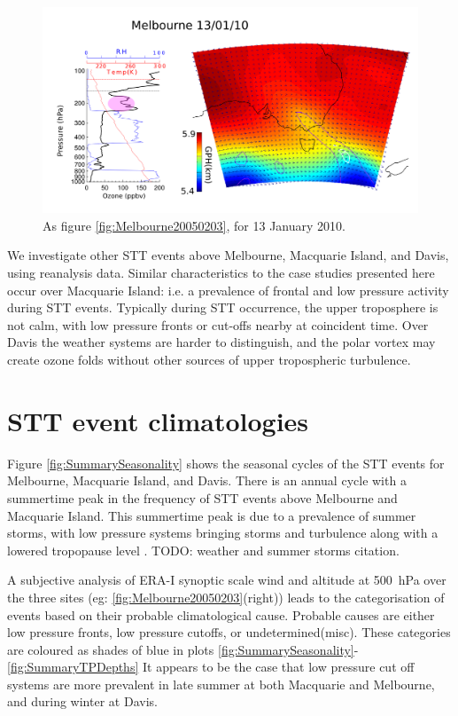 \documentclass{article}
\begin{document}
  \begin{figure}[!htbp]
    \begin{center}
    \includegraphics[width=1.0\columnwidth]{figures/Melbourne20100113.png}
    \caption{As figure \ref{fig:Melbourne20050203}, for 13 January 2010.}
    \label{fig:Melbourne20100113}
    \end{center}
  \end{figure}

  We investigate other STT events above Melbourne, Macquarie Island, and Davis, using reanalysis data.
  Similar characteristics to the case studies presented here occur over Macquarie Island: i.e. a prevalence of frontal and low pressure activity during STT events.
  Typically during STT occurrence, the upper troposphere is not calm, with low pressure fronts or cut-offs nearby at coincident time.
  Over Davis the weather systems are harder to distinguish, and the polar vortex may create ozone folds without other sources of upper tropospheric turbulence.

\section{STT event climatologies}

  Figure \ref{fig:SummarySeasonality} shows the seasonal cycles of the STT events for Melbourne, Macquarie Island, and Davis. 
  There is an annual cycle with a summertime peak in the frequency of STT events above Melbourne and Macquarie Island.
  This summertime peak is due to a prevalence of summer storms, with low pressure systems bringing storms and turbulence along with a lowered tropopause level \citep{Reutter2015}. TODO: weather and summer storms citation.
  
  A subjective analysis of ERA-I synoptic scale wind and altitude at 500~hPa over the three sites (eg: \ref{fig:Melbourne20050203}(right)) leads to the categorisation of events based on their probable climatological cause.
  Probable causes are either low pressure fronts, low pressure cutoffs, or undetermined(misc).
  These categories are coloured as shades of blue in plots \ref{fig:SummarySeasonality}-\ref{fig:SummaryTPDepths}
  It appears to be the case that low pressure cut off systems are more prevalent in late summer at both Macquarie and Melbourne, and during winter at Davis.
\end{document}
